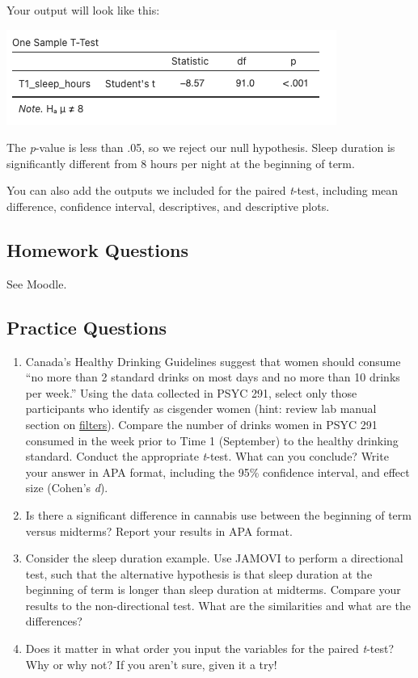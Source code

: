 \documentclass[
]{book}
\begin{document}
Your output will look like this:

\includegraphics{img/onesampleoutput.png}

The \emph{p}-value is less than .05, so we reject our null hypothesis. Sleep duration is significantly different from 8 hours per night at the beginning of term.

You can also add the outputs we included for the paired \emph{t}-test, including mean difference, confidence interval, descriptives, and descriptive plots.

\hypertarget{homework-questions}{%
\subsection{Homework Questions}\label{homework-questions}}

See Moodle.

\hypertarget{practice-questions-1}{%
\subsection{Practice Questions}\label{practice-questions-1}}

\begin{enumerate}
\def\labelenumi{\arabic{enumi}.}
\item
  Canada's Healthy Drinking Guidelines suggest that women should consume ``no more than 2 standard drinks on most days and no more than 10 drinks per week.'' Using the data collected in PSYC 291, select only those participants who identify as cisgender women (hint: review lab manual section on \href{https://www.erinmazerolle.com/statisticsLab/lab-3-sampling-and-sampling-distributions.html\#other-types-of-filters}{filters}). Compare the number of drinks women in PSYC 291 consumed in the week prior to Time 1 (September) to the healthy drinking standard. Conduct the appropriate \emph{t}-test. What can you conclude? Write your answer in APA format, including the 95\% confidence interval, and effect size (Cohen's \emph{d}).
\item
  Is there a significant difference in cannabis use between the beginning of term versus midterms? Report your results in APA format.
\item
  Consider the sleep duration example. Use JAMOVI to perform a directional test, such that the alternative hypothesis is that sleep duration at the beginning of term is longer than sleep duration at midterms. Compare your results to the non-directional test. What are the similarities and what are the differences?
\item
  Does it matter in what order you input the variables for the paired \emph{t}-test? Why or why not? If you aren't sure, given it a try!
\end{enumerate}
\end{document}
